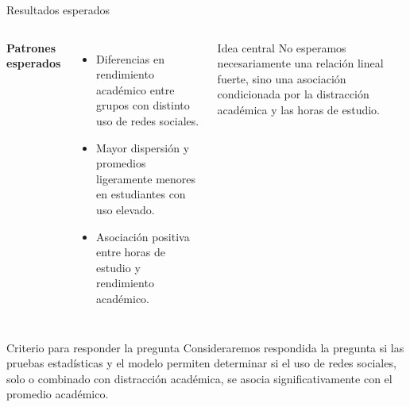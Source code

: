 \documentclass[aspectratio=169,xcolor=dvipsnames]{beamer}
\begin{document}


\begin{frame}{Resultados esperados}

\small

\begin{columns}[T]


\textbf{Patrones esperados}

\begin{itemize}
    \item Diferencias en rendimiento académico entre grupos con distinto uso de redes sociales.
    \item Mayor dispersión y promedios ligeramente menores en estudiantes con uso elevado.
    \item Asociación positiva entre horas de estudio y rendimiento académico.
\end{itemize}


\begin{block}{Idea central}
No esperamos necesariamente una relación lineal fuerte, sino una asociación condicionada
por la distracción académica y las horas de estudio.
\end{block}

\end{columns}

\vspace{0.3cm}

\begin{alertblock}{Criterio para responder la pregunta}
Consideraremos respondida la pregunta si las pruebas estadísticas y el modelo permiten determinar
si el uso de redes sociales, solo o combinado con distracción académica, se asocia significativamente
con el promedio académico.
\end{alertblock}

\end{frame}

\end{document}
